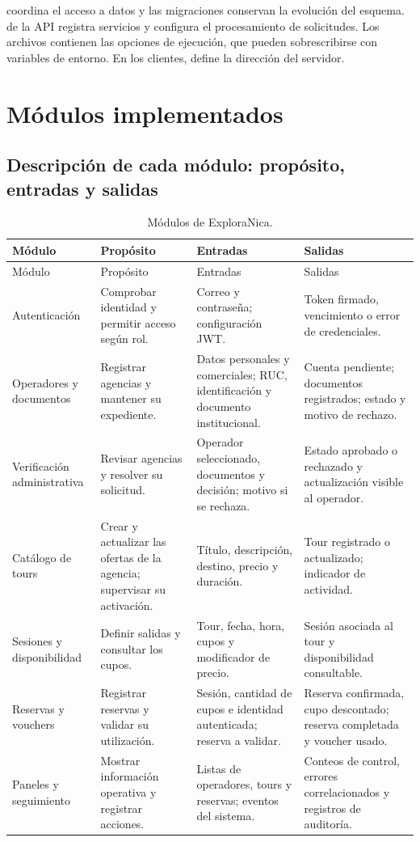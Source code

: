  coordina el acceso a datos y las migraciones conservan la evolución del esquema.  de la API registra servicios y configura el procesamiento de solicitudes. Los archivos  contienen las opciones de ejecución, que pueden sobrescribirse con variables de entorno. En los clientes,  define la dirección del servidor.

\section{Módulos implementados}
\subsection{Descripción de cada módulo: propósito, entradas y salidas}
\begin{longtable}{@{}P{2.5cm}P{3.25cm}P{3.25cm}P{3.3cm}@{}}
\caption{Módulos de ExploraNica.}\label{tab:modulos}\\
\toprule Módulo & Propósito & Entradas & Salidas \\ \midrule\endfirsthead
\toprule Módulo & Propósito & Entradas & Salidas \\ \midrule\endhead
Autenticación & Comprobar identidad y permitir acceso según rol. & Correo y contraseña; configuración JWT. & Token firmado, vencimiento o error de credenciales. \\
Operadores y documentos & Registrar agencias y mantener su expediente. & Datos personales y comerciales; RUC, identificación y documento institucional. & Cuenta pendiente; documentos registrados; estado y motivo de rechazo. \\
Verificación administrativa & Revisar agencias y resolver su solicitud. & Operador seleccionado, documentos y decisión; motivo si se rechaza. & Estado aprobado o rechazado y actualización visible al operador. \\
Catálogo de tours & Crear y actualizar las ofertas de la agencia; supervisar su activación. & Título, descripción, destino, precio y duración. & Tour registrado o actualizado; indicador de actividad. \\
Sesiones y disponibilidad & Definir salidas y consultar los cupos. & Tour, fecha, hora, cupos y modificador de precio. & Sesión asociada al tour y disponibilidad consultable. \\
Reservas y vouchers & Registrar reservas y validar su utilización. & Sesión, cantidad de cupos e identidad autenticada; reserva a validar. & Reserva confirmada, cupo descontado; reserva completada y voucher usado. \\
Paneles y seguimiento & Mostrar información operativa y registrar acciones. & Listas de operadores, tours y reservas; eventos del sistema. & Conteos de control, errores correlacionados y registros de auditoría. \\
\bottomrule
\end{longtable}

